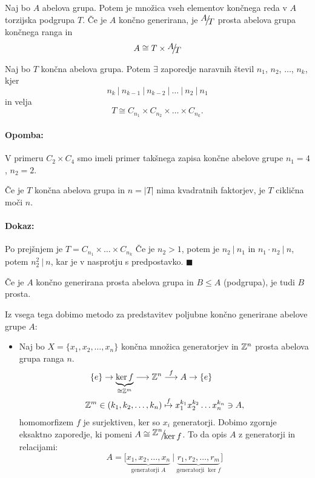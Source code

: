 \begin{trditev}
	 Naj bo $A$ abelova grupa. Potem je mno\v zica vseh elementov kon\v cnega reda v $A$ torzijska podgrupa $T$. \v Ce je $A$ kon\v cno generirana, je
	$\quot{A}{T}$ prosta abelova grupa kon\v cnega ranga in
	\[
		A \cong T \times \quot{A}{T}
	\]
\end{trditev}

\begin{trditev}
	 Naj bo $T$ kon\v cna abelova grupa. Potem $\exists$ zaporedje naravnih \v stevil $n_1$, $n_2$, $\ldots$, $n_k$, kjer
	\[
		n_k\ |\ n_{k-1}\ |\ n_{k-2}\ |\ \ldots\ |\ n_2\ |\ n_1
	\]
	in velja
	\[
		T \cong C_{n_1} \times C_{n_2} \times \ldots \times C_{n_k}.
	\]
\end{trditev}

\paragraph{Opomba:}
V primeru $C_2 \times C_4$ smo imeli primer tak\v snega zapisa kon\v cne abelove grupe $n_1 = 4$, $n_2 = 2$.

\begin{posledica}
	\v Ce je $T$ kon\v cna abelova grupa in $n = |T|$ nima kvadratnih faktorjev, je $T$ cikli\v cna mo\v ci $n$.
\end{posledica}

\paragraph{Dokaz:}
Po prej\v snjem je $T = C_{n_1} \times \ldots \times C_{n_k}$ \v Ce je $n_2 > 1$, potem je $n_2\ |\ n_1$ in $n_1 \cdot n_2\ |\ n$,
potem $n_2^2\ |\ n$, kar je v nasprotju s predpostavko. $\blacksquare$

\begin{posledica}
	\v Ce je $A$ kon\v cno generirana prosta abelova grupa in $B \leq A$ (podgrupa), je tudi $B$ prosta.
\end{posledica}

Iz vsega tega dobimo metodo za predstavitev poljubne kon\v cno generirane abelove grupe $A$:
\begin{itemize}
	\item{Naj bo $X = \{x_1, x_2,\ldots ,x_n\}$ kon\v cna mno\v zica generatorjev in $\mathbb{Z}^n$ prosta abelova grupa ranga $n$.
	\begin{align*}
		\{e\} \to \underbrace{\ker f}_{\cong \mathbb{Z}^m} \longrightarrow \mathbb{Z}^n &\stackrel{f}{\longrightarrow} A \to \{e\} \\
		\mathbb{Z}^m \in (k_1, k_2, \ldots, k_n) &\stackrel{f}{\mapsto}x_1^{k_1} x_2^{k_2} \ldots x_n^{k_n} \owns A,
	\end{align*}
	homomorfizem $f$ je surjektiven, ker so $x_i$ generatorji. Dobimo zgornje eksaktno zaporedje, ki pomeni $A \cong \quot{\Z^n}{\ker f}$. To
	da opis $A$ z generatorji in relacijami:
	\begin{equation}
		A = \big[\underbrace{x_1, x_2, \ldots, x_n}_\text{generatorji $A$}\ |\ \underbrace{r_1, r_2, \ldots, r_m}_\text{generatorji $\ker f$}\big]
	\end{equation}
	}
\end{itemize}

